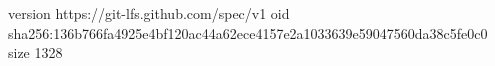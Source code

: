 version https://git-lfs.github.com/spec/v1
oid sha256:136b766fa4925e4bf120ac44a62ece4157e2a1033639e59047560da38c5fe0c0
size 1328
